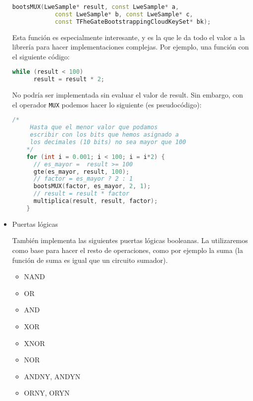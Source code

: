\begin{itemize}
  \begin{lstlisting}[language=c++]
    bootsMUX(LweSample* result, const LweSample* a,
            const LweSample* b, const LweSample* c,
            const TFheGateBootstrappingCloudKeySet* bk);
  \end{lstlisting}

  Esta función es especialmente interesante, y es la que le da todo el valor a la librería para hacer implementaciones complejas. Por ejemplo, una función con el siguiente código:

  \begin{lstlisting}[language=c++]
    while (result < 100)
      result = result * 2;
  \end{lstlisting}

  No podría ser implementada sin evaluar el valor de result. Sin embargo, con el operador \verb|MUX| podemos hacer lo siguiente (es pseudocódigo):

  \begin{lstlisting}[language=c++]
    /*
     Hasta que el menor valor que podamos 
     escribir con los bits que hemos asignado a 
     los decimales (10 bits) no sea mayor que 100
    */
    for (int i = 0.001; i < 100; i = i*2) {
      // es_mayor =  result >= 100
      gte(es_mayor, result, 100); 
      // factor = es_mayor ? 2 : 1
      bootsMUX(factor, es_mayor, 2, 1); 
      // result = result * factor
      multiplica(result, result, factor); 
    }
  \end{lstlisting}

  \item Puertas lógicas

  También implementa las siguientes puertas lógicas booleanas. La utilizaremos como base para hacer el resto de operaciones, como por ejemplo la suma (la función de suma es igual que un circuito sumador).

  \begin{itemize}
    \item NAND

    \item OR

    \item AND

    \item XOR

    \item XNOR

    \item NOR

    \item ANDNY, ANDYN

    \item ORNY, ORYN

  \end{itemize}

\end{itemize}

